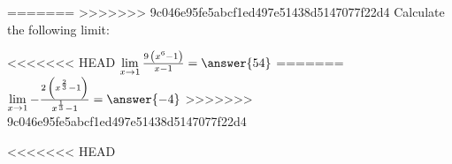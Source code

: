 {\begin{problem}
{\begin{problem}
{\begin{problem}
{\begin{problem}
{\begin{problem}
{\begin{problem}
{\begin{problem}
{\begin{problem}
{\begin{problem}
{\begin{problem}
{\begin{problem}
{\begin{problem}
{\begin{problem}
{\begin{problem}
{\begin{problem}
{\begin{problem}
{\begin{problem}
{\begin{problem}
{\begin{problem}
{\begin{problem}
{\begin{problem}
{\begin{problem}
{\begin{problem}
{\begin{problem}
{\begin{problem}
{\begin{problem}
{\begin{problem}
{\begin{problem}
{\begin{problem}
{\begin{problem}
{\begin{problem}
{\begin{problem}
{\begin{problem}
{\begin{problem}
{\begin{problem}
{\begin{problem}
=======
>>>>>>> 9c046e95fe5abcf1ed497e51438d5147077f22d4
Calculate the following limit:



<<<<<<< HEAD
$\lim\limits_{x \rightarrow {1}} {\frac{9 \, {\left(x^{6} - 1\right)}}{x - 1}} = \answer{54}$
=======
$\lim\limits_{x \rightarrow {1}} {-\frac{2 \, {\left(x^{\frac{2}{3}} - 1\right)}}{x^{\frac{1}{3}} - 1}} = \answer{-4}$
>>>>>>> 9c046e95fe5abcf1ed497e51438d5147077f22d4
\end{problem}}








<<<<<<< HEAD
\end{problem}}
\end{problem}}
\end{problem}}
\end{problem}}
\end{problem}}
\end{problem}}
\end{problem}}
\end{problem}}
\end{problem}}
\end{problem}}
\end{problem}}
\end{problem}}
\end{problem}}
\end{problem}}
\end{problem}}
\end{problem}}
\end{problem}}
\end{problem}}
\end{problem}}
\end{problem}}
\end{problem}}
\end{problem}}
\end{problem}}
\end{problem}}
\end{problem}}
\end{problem}}
\end{problem}}
\end{problem}}
\end{problem}}
\end{problem}}
\end{problem}}
\end{problem}}
\end{problem}}
\end{problem}}
\end{problem}}
